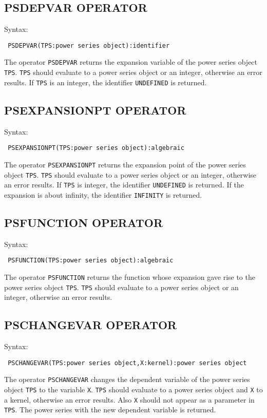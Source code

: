 \subsection*{PSDEPVAR OPERATOR}

Syntax:
\begin{verbatim}
 PSDEPVAR(TPS:power series object):identifier
\end{verbatim}
The operator {\tt PSDEPVAR} returns the expansion variable of the
power series object {\tt TPS}. {\tt TPS} should evaluate to a power
series object or an integer, otherwise an error results. If {\tt TPS}
is an integer, the identifier {\tt UNDEFINED} is returned.

\subsection*{PSEXPANSIONPT OPERATOR}

Syntax:
\begin{verbatim}
 PSEXPANSIONPT(TPS:power series object):algebraic
\end{verbatim}
The operator {\tt PSEXPANSIONPT} returns the expansion point of the
power series object {\tt TPS}. {\tt TPS} should evaluate to a power
series object or an integer, otherwise an error results. If {\tt TPS}
is integer, the identifier {\tt UNDEFINED} is returned. If the
expansion is about infinity, the identifier {\tt INFINITY} is
returned.

\subsection*{PSFUNCTION OPERATOR}

Syntax:
\begin{verbatim}
 PSFUNCTION(TPS:power series object):algebraic
\end{verbatim}
The operator {\tt PSFUNCTION} returns the function whose expansion
gave rise to the power series object {\tt TPS}. {\tt TPS} should
evaluate to a power series object or an integer, otherwise an error
results.

\subsection*{PSCHANGEVAR OPERATOR}

Syntax:
\begin{verbatim}
 PSCHANGEVAR(TPS:power series object,X:kernel):power series object
\end{verbatim}
The operator {\tt PSCHANGEVAR} changes the dependent variable of the
power series object {\tt TPS} to the variable {\tt X}. {\tt TPS}
should evaluate to a power series object and {\tt X} to a kernel,
otherwise an error results.  Also {\tt X} should not appear as a
parameter in {\tt TPS}. The power series with the new dependent
variable is returned.

